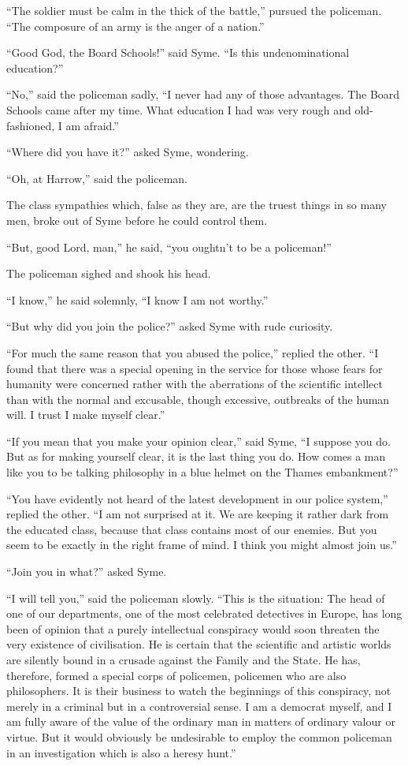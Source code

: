 “The soldier must be calm in the thick of the battle,” pursued the policeman. “The composure of an army is the anger of a nation.”

“Good God, the Board Schools!” said Syme. “Is this undenominational education?”

“No,” said the policeman sadly, “I never had any of those advantages. The Board Schools came after my time. What education I had was very rough and old-fashioned, I am afraid.”

“Where did you have it?” asked Syme, wondering.

“Oh, at Harrow,” said the policeman.

The class sympathies which, false as they are, are the truest things in so many men, broke out of Syme before he could control them.

“But, good Lord, man,” he said, “you oughtn’t to be a policeman!”

The policeman sighed and shook his head.

“I know,” he said solemnly, “I know I am not worthy.”

“But why did you join the police?” asked Syme with rude curiosity.

“For much the same reason that you abused the police,” replied the other. “I found that there was a special opening in the service for those whose fears for humanity were concerned rather with the aberrations of the scientific intellect than with the normal and excusable, though excessive, outbreaks of the human will. I trust I make myself clear.”

“If you mean that you make your opinion clear,” said Syme, “I suppose you do. But as for making yourself clear, it is the last thing you do. How comes a man like you to be talking philosophy in a blue helmet on the Thames embankment?”

“You have evidently not heard of the latest development in our police system,” replied the other. “I am not surprised at it. We are keeping it rather dark from the educated class, because that class contains most of our enemies. But you seem to be exactly in the right frame of mind. I think you might almost join us.”

“Join you in what?” asked Syme.

“I will tell you,” said the policeman slowly. “This is the situation: The head of one of our departments, one of the most celebrated detectives in Europe, has long been of opinion that a purely intellectual conspiracy would soon threaten the very existence of civilisation. He is certain that the scientific and artistic worlds are silently bound in a crusade against the Family and the State. He has, therefore, formed a special corps of policemen, policemen who are also philosophers. It is their business to watch the beginnings of this conspiracy, not merely in a criminal but in a controversial sense. I am a democrat myself, and I am fully aware of the value of the ordinary man in matters of ordinary valour or virtue. But it would obviously be undesirable to employ the common policeman in an investigation which is also a heresy hunt.”


